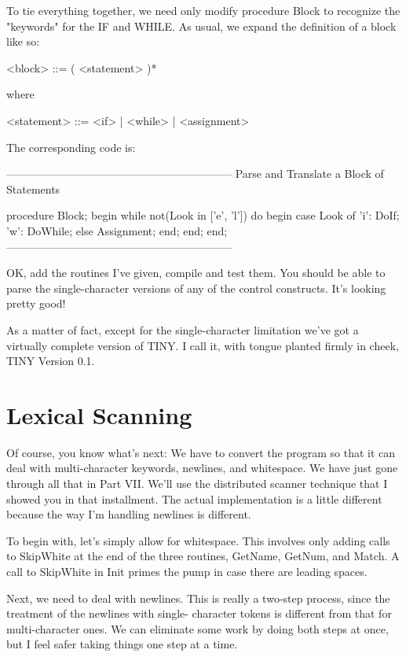 \documentclass[float=false, crop=false]{standalone}
\begin{document}
To tie everything together, we need only modify procedure Block to recognize the
"keywords" for the IF and WHILE. As usual, we expand the definition of a block
like so:


     <block> ::= ( <statement> )*


where


     <statement> ::= <if> | <while> | <assignment>


The corresponding code is:

\begin{code}
{--------------------------------------------------------------}
{ Parse and Translate a Block of Statements }

procedure Block;
begin
   while not(Look in ['e', 'l']) do begin
      case Look of
       'i': DoIf;
       'w': DoWhile;
      else Assignment;
      end;
   end;
end;
{--------------------------------------------------------------}
\end{code}

OK, add the routines I've given, compile and test them. You should be able to
parse the single-character versions of any of the control constructs. It's
looking pretty good!

As a matter of fact, except for the single-character limitation we've got a
virtually complete version of TINY. I call it, with tongue planted firmly in
cheek, TINY Version 0.1.


\section{Lexical Scanning}

Of course, you know what's next: We have to convert the program so that it can
deal with multi-character keywords, newlines, and whitespace. We have just gone
through all that in Part VII. We'll use the distributed scanner technique that I
showed you in that installment. The actual implementation is a little different
because the way I'm handling newlines is different.

To begin with, let's simply allow for whitespace. This involves only adding
calls to SkipWhite at the end of the three routines, GetName, GetNum, and Match.
A call to SkipWhite in Init primes the pump in case there are leading spaces.

Next, we need to deal with newlines. This is really a two-step process, since
the treatment of the newlines with single- character tokens is different from
that for multi-character ones. We can eliminate some work by doing both steps at
once, but I feel safer taking things one step at a time.
\end{document}
